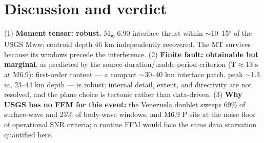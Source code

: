 \documentclass[11pt]{article}
\begin{document}
\section{Discussion and verdict}
(1) \textbf{Moment tensor: robust.} M\textsubscript{w} 6.90 interface thrust within
$\sim$10--15$^\circ$ of the USGS Mww; centroid depth 46 km independently recovered. The MT
survives because its windows precede the interference. (2) \textbf{Finite fault: obtainable but
marginal}, as predicted by the source-duration/usable-period criterion (T$\approx$13 s at M6.9):
first-order content --- a compact $\sim$30--40 km interface patch, peak $\sim$1.3 m, 23--44 km
depth --- is robust; internal detail, extent, and directivity are not resolved, and the plane
choice is tectonic rather than data-driven. (3) \textbf{Why USGS has no FFM for this event:} the
Venezuela doublet sweeps 69\% of surface-wave and 23\% of body-wave windows, and M6.9 P sits at
the noise floor of operational SNR criteria; a routine FFM would face the same data starvation
quantified here.
\end{document}
